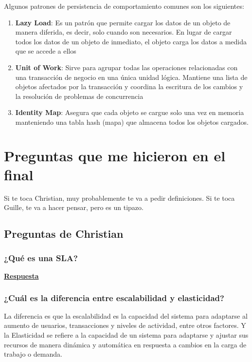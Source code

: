 \documentclass{article}
\begin{document}
		Algunos patrones de persistencia de comportamiento comunes son los siguientes:
		
			\begin{enumerate}
			\item {\textbf{Lazy Load}}: Es un patrón que permite cargar los datos de un objeto de manera diferida, es decir, solo cuando son necesarios. En lugar de cargar todos los datos de un objeto de inmediato, el objeto carga los datos a medida que se accede a ellos
			
			\item {\textbf{Unit of Work}}: Sirve para agrupar todas las operaciones relacionadas con una transacción de negocio en una única unidad lógica. Mantiene una lista de objetos afectados por la transacción y coordina la escritura de los cambios y la resolución de problemas de concurrencia
			
			
			\item {\textbf{Identity Map}}: Asegura que cada objeto se cargue solo una vez en memoria manteniendo una tabla hash (mapa) que almacena todos los objetos cargados.
			
		\end{enumerate}






  \section{Preguntas que me hicieron en el final}
  Si te toca Christian, muy probablemente te va a pedir definiciones. Si te toca Guille, te va a hacer pensar, pero es un tipazo.
   \subsection{Preguntas de Christian}
    \subsubsection{¿Qué es una SLA?}
    
    \textbf{\hyperlink{page.2}{Respuesta}}

    \subsubsection{¿Cuál es la diferencia entre escalabilidad y elasticidad?}

    La diferencia es que la escalabilidad es la capacidad del sistema para adaptarse al aumento de usuarios, transacciones y niveles de actividad, entre otros factores. 
    Y la Elasticidad se refiere a la capacidad de un sistema para adaptarse y ajustar sus recursos de manera dinámica y automática en respuesta a cambios en la carga de trabajo o demanda.
\end{document}
